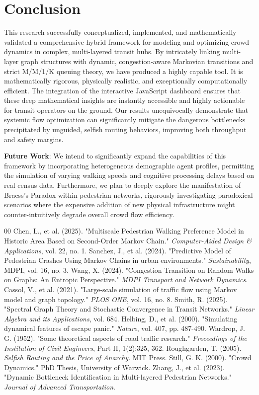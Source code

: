 \documentclass[conference]{IEEEtran}
\begin{document}
\section{Conclusion}
This research successfully conceptualized, implemented, and mathematically validated a comprehensive hybrid framework for modeling and optimizing crowd dynamics in complex, multi-layered transit hubs. By intricately linking multi-layer graph structures with dynamic, congestion-aware Markovian transitions and strict M/M/1/K queuing theory, we have produced a highly capable tool. It is mathematically rigorous, physically realistic, and exceptionally computationally efficient. The integration of the interactive JavaScript dashboard ensures that these deep mathematical insights are instantly accessible and highly actionable for transit operators on the ground. Our results unequivocally demonstrate that systemic flow optimization can significantly mitigate the dangerous bottlenecks precipitated by unguided, selfish routing behaviors, improving both throughput and safety margins.

\textbf{Future Work}: We intend to significantly expand the capabilities of this framework by incorporating heterogeneous demographic agent profiles, permitting the simulation of varying walking speeds and cognitive processing delays based on real census data. Furthermore, we plan to deeply explore the manifestation of Braess's Paradox within pedestrian networks, rigorously investigating paradoxical scenarios where the expensive addition of new physical infrastructure might counter-intuitively degrade overall crowd flow efficiency.

\begin{thebibliography}{00}
 Chen, L., et al. (2025). "Multiscale Pedestrian Walking Preference Model in Historic Area Based on Second-Order Markov Chain." \textit{Computer-Aided Design \& Applications}, vol. 22, no. 1.
 Sanchez, J., et al. (2024). "Predictive Model of Pedestrian Crashes Using Markov Chains in urban environments." \textit{Sustainability}, MDPI, vol. 16, no. 3.
 Wang, X. (2024). "Congestion Transition on Random Walks on Graphs: An Entropic Perspective." \textit{MDPI Transport and Network Dynamics}.
 Cassol, V., et al. (2021). "Large-scale simulation of traffic flow using Markov model and graph topology." \textit{PLOS ONE}, vol. 16, no. 8.
 Smith, R. (2025). "Spectral Graph Theory and Stochastic Convergence in Transit Networks." \textit{Linear Algebra and its Applications}, vol. 684.
 Helbing, D., et al. (2000). "Simulating dynamical features of escape panic." \textit{Nature}, vol. 407, pp. 487-490.
 Wardrop, J. G. (1952). "Some theoretical aspects of road traffic research." \textit{Proceedings of the Institution of Civil Engineers}, Part II, 1(2):325, 362.
 Roughgarden, T. (2005). \textit{Selfish Routing and the Price of Anarchy}. MIT Press.
 Still, G. K. (2000). "Crowd Dynamics." PhD Thesis, University of Warwick.
 Zhang, J., et al. (2023). "Dynamic Bottleneck Identification in Multi-layered Pedestrian Networks." \textit{Journal of Advanced Transportation}.
\end{thebibliography}
\end{document}
